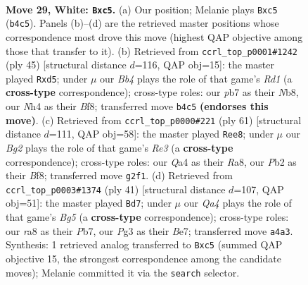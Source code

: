 \documentclass[11pt]{article}
\begin{document}
\clearpage

\begin{figure}[p]\centering
\begin{subfigure}{0.46\textwidth}\centering
\resizebox{\linewidth}{!}{%
\newchessgame
\chessboard[
  setfen={r2n1k2/1p1b1pp1/p2q4/2r3np/QB5N/4P1P1/PP2RPBP/1R4K1 w - - 0 29},
  showmover=false,
  pgfstyle=straightmove, color=movearrow, markmove={b4-c5}
]}
\caption{}
\end{subfigure}\hfill
\begin{subfigure}{0.46\textwidth}\centering
\resizebox{\linewidth}{!}{%
\newchessgame
\chessboard[
  setfen={1n1r1bk1/2r1qp1p/pp4pP/2pRP3/4Q3/P4NP1/1P2BP2/4K2R b K - 0 23},
  showmover=false,
  pgfstyle=straightmove, color=movearrow, markmove={d8-d5}
]}
\caption{}
\end{subfigure}
\\[4pt]
\begin{subfigure}{0.46\textwidth}\centering
\resizebox{\linewidth}{!}{%
\newchessgame
\chessboard[
  setfen={r4bk1/3n1p1p/3pr1p1/2p5/q1P5/1R2PP1P/2Q3PB/2R2NK1 b - - 6 31},
  showmover=false,
  pgfstyle=straightmove, color=movearrow, markmove={e6-e8}
]}
\caption{}
\end{subfigure}\hfill
\begin{subfigure}{0.46\textwidth}\centering
\resizebox{\linewidth}{!}{%
\newchessgame
\chessboard[
  setfen={r3k3/pp2b3/1qpp4/4n1p1/4P1b1/PNN1P1R1/1PPK1QBr/R7 b q - 6 21},
  showmover=false,
  pgfstyle=straightmove, color=movearrow, markmove={g4-d7}
]}
\caption{}
\end{subfigure}
\caption{\textbf{Move 29, White: \texttt{Bxc5}.} (a) Our position; Melanie plays \texttt{Bxc5} (\texttt{b4c5}). Panels (b)--(d) are the retrieved master positions whose correspondence most drove this move (highest QAP objective among those that transfer to it). (b) Retrieved from \texttt{ccrl\_top\_p0001\#1242} (ply 45) [structural distance $d$=116, QAP obj=15]: the master played \texttt{Rxd5}; under $\mu$ our \emph{Bb4} plays the role of that game's \emph{Rd1} (a \textbf{cross-type} correspondence); cross-type roles: our \emph{p}b7 as their \emph{N}b8, our \emph{N}h4 as their \emph{B}f8; transferred move \texttt{b4c5} \textbf{(endorses this move)}. (c) Retrieved from \texttt{ccrl\_top\_p0000\#221} (ply 61) [structural distance $d$=111, QAP obj=58]: the master played \texttt{Ree8}; under $\mu$ our \emph{Bg2} plays the role of that game's \emph{Re3} (a \textbf{cross-type} correspondence); cross-type roles: our \emph{Q}a4 as their \emph{R}a8, our \emph{P}b2 as their \emph{B}f8; transferred move \texttt{g2f1}. (d) Retrieved from \texttt{ccrl\_top\_p0003\#1374} (ply 41) [structural distance $d$=107, QAP obj=51]: the master played \texttt{Bd7}; under $\mu$ our \emph{Qa4} plays the role of that game's \emph{Bg5} (a \textbf{cross-type} correspondence); cross-type roles: our \emph{r}a8 as their \emph{P}b7, our \emph{P}g3 as their \emph{B}e7; transferred move \texttt{a4a3}. Synthesis: 1 retrieved analog transferred to \texttt{Bxc5} (summed QAP objective 15, the strongest correspondence among the candidate moves); Melanie committed it via the \texttt{search} selector.}
\label{fig:thought-m56}
\end{figure}
\end{document}
